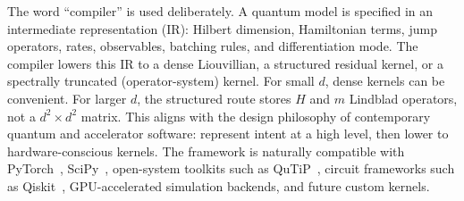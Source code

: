 \documentclass[11pt]{article}
\begin{document}
The word ``compiler'' is used deliberately. A quantum model is specified in an intermediate representation (IR): Hilbert dimension, Hamiltonian terms, jump operators, rates, observables, batching rules, and differentiation mode. The compiler lowers this IR to a dense Liouvillian, a structured residual kernel, or a spectrally truncated (operator-system) kernel. For small $d$, dense kernels can be convenient. For larger $d$, the structured route stores $H$ and $m$ Lindblad operators, not a $d^2\times d^2$ matrix. This aligns with the design philosophy of contemporary quantum and accelerator software: represent intent at a high level, then lower to hardware-conscious kernels. The framework is naturally compatible with PyTorch~\cite{paszke2019pytorch}, SciPy~\cite{virtanen2020scipy}, open-system toolkits such as QuTiP~\cite{qutip2024}, circuit frameworks such as Qiskit~\cite{qiskit2024}, GPU-accelerated simulation backends, and future custom kernels.
\end{document}
